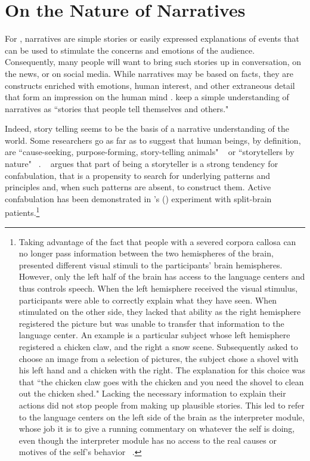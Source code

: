 \documentclass[11pt,a4paper,english,oneside]{book}
\numberwithin{equation}{chapter}
\begin{document}
\section{On the Nature of Narratives}\label{CH:2.1}

For \citeauthor{Shiller.2017}, narratives are simple stories or easily expressed explanations of events that can be used to stimulate the concerns and emotions of the audience. Consequently, many people will want to bring such stories up in conversation, on the news, or on social media. While narratives may be based on facts, they are constructs enriched with emotions, human interest, and other extraneous detail that form an impression on the human mind \cite[pp. 968--973]{Shiller.2017}. \citet[p. 58]{Akerlof.2016} keep a simple understanding of narratives as ``stories that people tell themselves and others." 

Indeed, story telling seems to be the basis of a narrative understanding of the world. Some researchers go as far as to suggest that human beings, by definition, are ``cause-seeking, purpose-forming, story-telling animals" ~\cite[p.~434]{Atran.2010} or ``storytellers by nature" ~\cite[p.~27]{McAdams.1993}. 
~\citet[p.~434]{Atran.2010} argues that part of being a storyteller is a strong  tendency  for  confabulation,  that is a propensity to search for underlying patterns and principles and, when  such patterns are absent, to construct them. Active confabulation has been demonstrated in \citeauthor{Gazzaniga.1985}'s (\citeyear{Gazzaniga.1985}) experiment with split-brain patients.\footnote{Taking advantage of the fact that people with a severed corpora callosa can no longer pass information between the two hemispheres of the brain, \citeauthor{Gazzaniga.1985} presented different visual stimuli to the participants' brain hemispheres. However, only the left half of the brain has access to the language centers and thus controls speech. When the left hemisphere received the visual stimulus, participants were able to correctly explain what they have seen. When stimulated on the other side, they lacked that ability as the right hemisphere registered the picture but was unable to transfer that information to the language center. An example is a particular subject whose left hemisphere registered a chicken claw, and the right a snow scene. Subsequently asked to choose an image from a selection of pictures, the subject chose a shovel with his left hand and a chicken with the right. The explanation for this choice was that ``the chicken claw goes with the chicken and you need the shovel to clean out the chicken shed." Lacking the necessary information to explain their actions did not stop people from making up plausible stories. This led \citeauthor{Gazzaniga.1985} to refer to the language centers on the left side of the brain as the interpreter module, whose job it is to give a running commentary on whatever the self is doing, even though the interpreter module has no access to the real causes or motives of the self's behavior ~\citep{Gazzaniga.1985, GazzanigaM.IvryR.andMangunG..1998}.}
\end{document}
